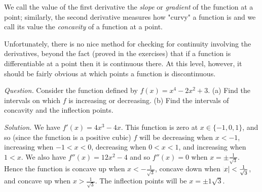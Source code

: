 We call the value of the first derivative the \textit{slope} or \textit{gradient} of the function at a point; similarly,
the second derivative measures how "curvy" a function is and we call its value the \textit{concavity} of a function
at a point.

Unfortunately, there is no nice method for checking for continuity involving the derivatives, beyond the fact (proved in the exercises)
that if a function is differentiable at a point then it is continuous there. At this level, however, it should be fairly obvious at which
points a function is discontinuous.

\begin{ex}
  \textit{Question.} Consider the function defined by $ f(x) = x^4 - 2x^2 + 3 $. (a) Find the intervals on which $ f $
  is increasing or decreasing. (b) Find the intervals of concavity and the inflection points.

  \textit{Solution.} We have $ f'(x) = 4x^3 - 4x $. This function is zero at $ x \in \{-1, 0, 1\} $, and so (since the function
  is a positive cubic) $ f $ will be decreasing when $ x < -1 $, increasing when $ -1 < x < 0 $, decreasing when $ 0 < x < 1 $,
  and increasing when $ 1 < x $. We also have $ f''(x) = 12x^2 - 4 $ and so $ f''(x) = 0 $ when $ x = \pm \frac{1}{\sqrt{3}} $.
  Hence the function is concave up when $ x < -\frac{1}{\sqrt{3}} $, concave down when $ \abs{x} < \frac{1}{\sqrt{3}} $, and concave
  up when $ x > \frac{1}{\sqrt{3}} $. The inflection points will be $ x = \pm{1}{\sqrt{3}} $.
  \begin{center}
  \end{center}
\end{ex}

\clearpage
